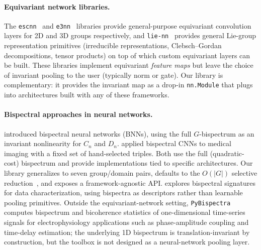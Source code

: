 \documentclass{article}
\theoremstyle{definition}
\theoremstyle{remark}
\theoremstyle{definition}
\begin{document}
\paragraph{Equivariant network libraries.}
The \texttt{escnn}~\citep{cesa2022program} and \texttt{e3nn}~\citep{geiger2022e3nn}
libraries provide general-purpose equivariant convolution layers for 2D and 3D
groups respectively, and \texttt{lie-nn}~\citep{batatia2023general}
provides general Lie-group representation primitives (irreducible
representations, Clebsch--Gordan decompositions, tensor products) on
top of which custom equivariant layers can be built. These libraries
implement equivariant \emph{feature maps} but leave the choice of
invariant pooling to the user (typically norm or gate). Our library is
complementary: it provides the invariant map as a drop-in
\texttt{nn.Module} that plugs into architectures built with any of these
frameworks.

\paragraph{Bispectral approaches in neural networks.}
\citet{sanborn2023bispectral} introduced bispectral neural networks (BNNs),
using the full $G$-bispectrum as an invariant nonlinearity for $C_n$ and $D_n$.
\citet{oreiller2022bispectral} applied bispectral CNNs to medical imaging
with a fixed set of hand-selected triples. Both use the full (quadratic-cost)
bispectrum and provide implementations tied to specific architectures.
Our library generalizes to seven group/domain pairs, defaults to the
$O(|G|)$ selective reduction~\citep{mataigne2024selective}, and exposes
a framework-agnostic API.
\citet{chevalley2024bispectral} explores bispectral signatures for data
characterization, using bispectra as descriptors rather than learnable
pooling primitives.
Outside the equivariant-network setting,
\texttt{PyBispectra}~\citep{binns2025pybispectra} computes bispectrum
and bicoherence statistics of one-dimensional time-series signals for
electrophysiology applications such as phase-amplitude coupling and
time-delay estimation; the underlying 1D bispectrum is translation-invariant
by construction, but the toolbox is not designed as a neural-network
pooling layer.
\end{document}
